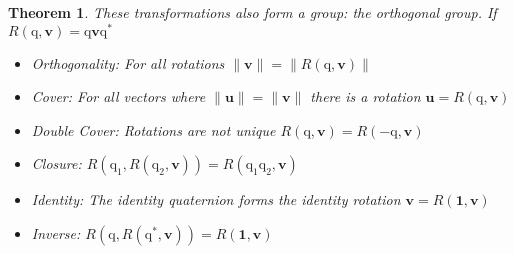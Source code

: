 \documentclass{amsart}
\newtheorem{theorem}{Theorem}[section]
\theoremstyle{definition}
\theoremstyle{remark}
\numberwithin{equation}{section}
\begin{document}
\begin{theorem}
  These transformations also form a group: the orthogonal group. If $R(\mathrm{q}, \mathbf{v})=\mathrm{q}\mathbf{v}\mathrm{q}^*$
  \begin{itemize}
  \item Orthogonality: For all rotations $\|\mathbf{v}\|=\|R(\mathrm{q}, \mathbf{v})\|$
  \item Cover: For all vectors where $\|\mathbf{u}\|=\|\mathbf{v}\|$ there is a rotation $\mathbf{u}=R(\mathrm{q}, \mathbf{v})$
  \item Double Cover: Rotations are not unique $R(\mathrm{q},\mathbf{v})=R(-\mathrm{q},\mathbf{v})$
  \item Closure: $R(\mathrm{q}_1, R(\mathrm{q}_2, \mathbf{v})) = R(\mathrm{q}_1\mathrm{q}_2, \mathbf{v})$
  \item Identity: The identity quaternion forms the identity rotation $\mathbf{v} = R(\mathbf{1}, \mathbf{v})$
  \item Inverse: $R(\mathrm{q}, R(\mathrm{q}^*, \mathbf{v})) = R(\mathbf{1}, \mathbf{v})$
  \end{itemize}
\end{theorem}
\end{document}
